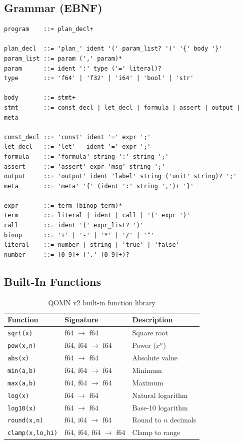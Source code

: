 \documentclass[12pt,a4paper]{article}
\begin{document}
\subsection{Grammar (EBNF)}

\begin{lstlisting}[caption=QOMN v2 formal grammar]
program    ::= plan_decl+

plan_decl  ::= 'plan_' ident '(' param_list? ')' '{' body '}'
param_list ::= param (',' param)*
param      ::= ident ':' type ('=' literal)?
type       ::= 'f64' | 'f32' | 'i64' | 'bool' | 'str'

body       ::= stmt+
stmt       ::= const_decl | let_decl | formula | assert | output | meta

const_decl ::= 'const' ident '=' expr ';'
let_decl   ::= 'let'   ident '=' expr ';'
formula    ::= 'formula' string ':' string ';'
assert     ::= 'assert' expr 'msg' string ';'
output     ::= 'output' ident 'label' string ('unit' string)? ';'
meta       ::= 'meta' '{' (ident ':' string ',')+ '}'

expr       ::= term (binop term)*
term       ::= literal | ident | call | '(' expr ')'
call       ::= ident '(' expr_list? ')'
binop      ::= '+' | '-' | '*' | '/' | '^'
literal    ::= number | string | 'true' | 'false'
number     ::= [0-9]+ ('.' [0-9]+)?
\end{lstlisting}

\subsection{Built-In Functions}

\begin{table}[h]
\centering
\caption{QOMN v2 built-in function library}
\begin{tabular}{lll}
\toprule
Function & Signature & Description \\
\midrule
\texttt{sqrt(x)} & f64 $\to$ f64 & Square root \\
\texttt{pow(x,n)} & f64, f64 $\to$ f64 & Power ($x^n$) \\
\texttt{abs(x)} & f64 $\to$ f64 & Absolute value \\
\texttt{min(a,b)} & f64, f64 $\to$ f64 & Minimum \\
\texttt{max(a,b)} & f64, f64 $\to$ f64 & Maximum \\
\texttt{log(x)} & f64 $\to$ f64 & Natural logarithm \\
\texttt{log10(x)} & f64 $\to$ f64 & Base-10 logarithm \\
\texttt{round(x,n)} & f64, i64 $\to$ f64 & Round to $n$ decimals \\
\texttt{clamp(x,lo,hi)} & f64, f64, f64 $\to$ f64 & Clamp to range \\
\bottomrule
\end{tabular}
\end{table}
\end{document}
